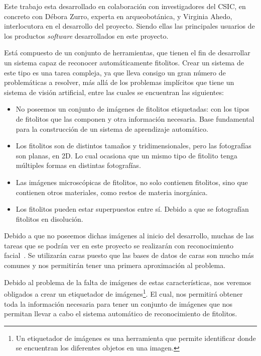 
Este trabajo esta desarrollado en colaboración con investigadores del CSIC, en concreto con Débora Zurro, experta en arqueobotánica, y Virginia Ahedo, interlocutora en el desarrollo del proyecto. Siendo ellas las principales usuarios de los productos \textit{software} desarrollados en este proyecto. 

Está compuesto de un conjunto de herramientas, que tienen el fin de desarrollar un sistema capaz de reconocer automáticamente fitolitos. Crear un sistema de este tipo es una tarea compleja, ya que lleva consigo un gran número de problemáticas a resolver, más allá de los problemas implícitos que tiene un sistema de visión artificial, entre las cuales se encuentran las siguientes:

\begin{itemize}
	\item No poseemos un conjunto de imágenes de fitolitos etiquetadas: con los tipos de fitolitos que las componen y otra información necesaria. Base fundamental para la construcción de un sistema de aprendizaje automático.
	\item Los fitolitos son de distintos tamaños y tridimensionales, pero las fotografías son planas, en 2D. Lo cual ocasiona que un mismo tipo de fitolito tenga múltiples formas en distintas fotografías.
	\item Las imágenes microscópicas de fitolitos, no solo contienen fitolitos, sino que contienen otros materiales, como restos de materia inorgánica.
	\item Los fitolitos pueden estar superpuestos entre sí. Debido a que se fotografían fitolitos en disolución.
\end{itemize}

Debido a que no poseemos dichas imágenes al inicio del desarrollo, muchas de las tareas que se podrán ver en este proyecto se realizarán con reconocimiento facial~\cite{facedetection}. Se utilizarán caras puesto que las bases de datos de caras son mucho más comunes y nos permitirán tener una primera aproximación al problema.

Debido al problema de la falta de imágenes de estas características, nos veremos obligados a crear un etiquetador de imágenes\footnote{Un etiquetador de imágenes es una herramienta que permite identificar donde se encuentran los diferentes objetos en una imagen.}. El cual, nos permitirá obtener toda la información necesaria para tener un conjunto de imágenes que nos permitan llevar a cabo el sistema automático de reconocimiento de fitolitos.

